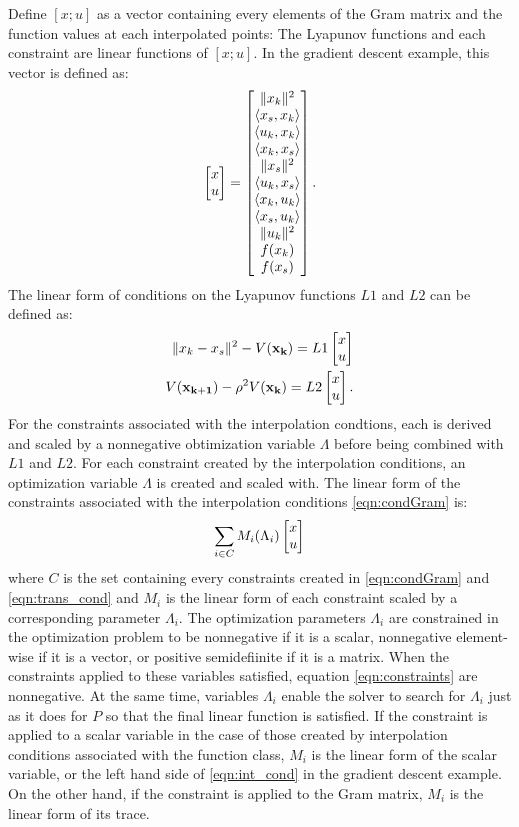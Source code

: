 Define $[x; u]$ as a vector containing every elements of the Gram matrix and the function values at each interpolated points: The Lyapunov functions and each constraint are linear functions of $[x; u]$. In the gradient descent example, this vector is defined as:
\begin{equation} \label{eqn:xu}
	\begin{bmatrix}x\\ u\end{bmatrix} = \begin{bmatrix}\|x_k\|^2 \\ \langle x_s, x_k \rangle \\ \langle u_k, x_k \rangle \\ \langle x_k, x_s \rangle \\ \|x_s\|^2 \\ \langle u_k, x_s \rangle \\ \langle x_k, u_k \rangle \\ \langle x_s, u_k \rangle \\ \|u_k\|^2 \\ f(x_k) \\ f(x_s)\end{bmatrix}.
\end{equation}
The linear form of conditions on the Lyapunov functions $L1$ and $L2$ can be defined as:
\begin{subequations}
	\begin{align}
		\|x_k - x_s\|^2 - V(\mathbf{x_k}) = L1\begin{bmatrix}x\\ u\end{bmatrix}\\
		V(\mathbf{x_{k+1}}) - \rho ^2V(\mathbf{x_k}) = L2\begin{bmatrix}x\\ u\end{bmatrix}.
	\end{align}
\end{subequations}
For the constraints associated with the interpolation condtions, each is derived and scaled by a nonnegative obtimization variable $\Lambda$ before being combined with $L1$ and $L2$. For each constraint created by the interpolation conditions, an optimization variable $\Lambda $ is created and scaled with. The linear form of the constraints associated with the interpolation conditions \eqref{eqn:condGram} is:
\begin{equation} \label{eqn:constraints}
	\sum_{i \in C}M_i(\Lambda_i)\begin{bmatrix}x\\u\end{bmatrix}
\end{equation}
where $C$ is the set containing every constraints created in \eqref{eqn:condGram} and \eqref{eqn:trans_cond} and $M_i$ is the linear form of each constraint scaled by a corresponding parameter $\Lambda _i$. The optimization parameters $\Lambda _i$ are constrained in the optimization problem to be nonnegative if it is a scalar, nonnegative element-wise if it is a vector, or positive semidefiinite if it is a matrix. When the constraints applied to these variables satisfied, equation \eqref{eqn:constraints} are nonnegative. At the same time, variables $\Lambda _i$ enable the solver to search for $\Lambda _i$ just as it does for $P$ so that the final linear function is satisfied. If the constraint is applied to a scalar variable in the case of those created by interpolation conditions associated with the function class, $M_i$ is the linear form of the scalar variable, or the left hand side of \eqref{eqn:int_cond} in the gradient descent example. On the other hand, if the constraint is applied to the Gram matrix, $M_i$ is the linear form of its trace. 


